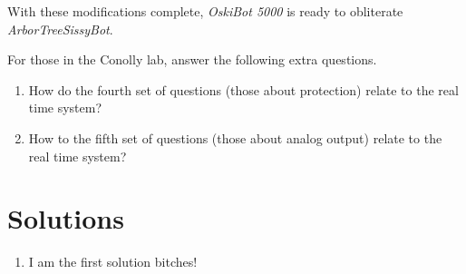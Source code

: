 \documentclass[10pt, letterpaper, acro-macros]{python-problem}
\newcommand{\oski}{\emph{OskiBot 5000}\xspace}
\begin{document}
With these modifications complete, \oski is ready to obliterate
\emph{ArborTreeSissyBot}.

For those in the Conolly lab, answer the following extra questions.

\begin{enumerate}[resume]
  \item How do the fourth set of questions (those about protection) relate
        to the real time system?
  \item How to the fifth set of questions (those about analog output)
        relate to the real time system?
\end{enumerate}


\beginsolution

\newpage
\section*{Solutions}

\begin{enumerate}
  \item I am the first solution bitches!
\end{enumerate}
\end{document}
